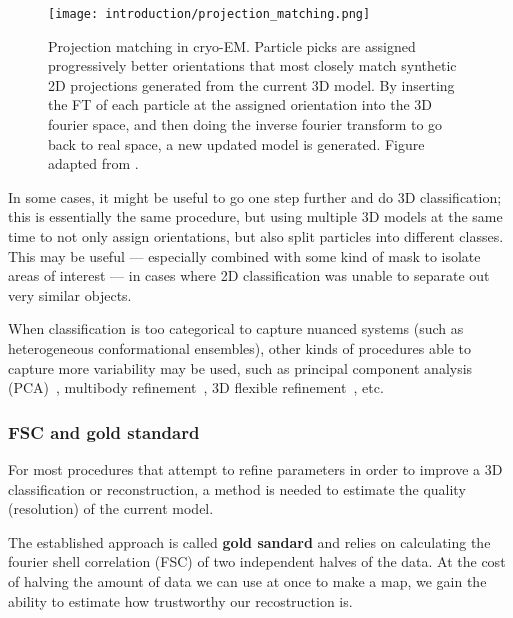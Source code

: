 \begin{figure}[ht]
    \centering
    \texttt{[image: introduction/projection\_matching.png]}
    \caption[Projection matching]{Projection matching in cryo-EM. Particle picks are assigned progressively better orientations that most closely match synthetic 2D projections generated from the current 3D model. By inserting the FT of each particle at the assigned orientation into the 3D fourier space, and then doing the inverse fourier transform to go back to real space, a new updated model is generated. Figure adapted from \citet{nogalesCryoEMUniqueTool2015}.}
    \label{fig:em_projection_matching}
\end{figure}

In some cases, it might be useful to go one step further and do 3D classification; this is essentially the same procedure, but using multiple 3D models at the same time to not only assign orientations, but also split particles into different classes.
This may be useful --- especially combined with some kind of mask to isolate areas of interest --- in cases where 2D classification was unable to separate out very similar objects.

When classification is too categorical to capture nuanced systems (such as heterogeneous conformational ensembles), other kinds of procedures able to capture more variability may be used, such as principal component analysis (PCA)~\cite{castano-diezDynamoFlexibleUserfriendly2012,punjani3DVariabilityAnalysis2021}, multibody refinement~\cite{nakaneMultibodyRefinementCryoEM2021}, 3D flexible refinement~\cite{punjani3DFlexibleRefinement2022}, etc.

\subsubsection{FSC and gold standard}\label{em_fsc}
For most procedures that attempt to refine parameters in order to improve a 3D classification or reconstruction, a method is needed to estimate the quality (resolution) of the current model.

The established approach is called \textbf{gold sandard} and relies on calculating the fourier shell correlation (FSC) of two independent halves of the data.
At the cost of halving the amount of data we can use at once to make a map, we gain the ability to estimate how trustworthy our recostruction is.

